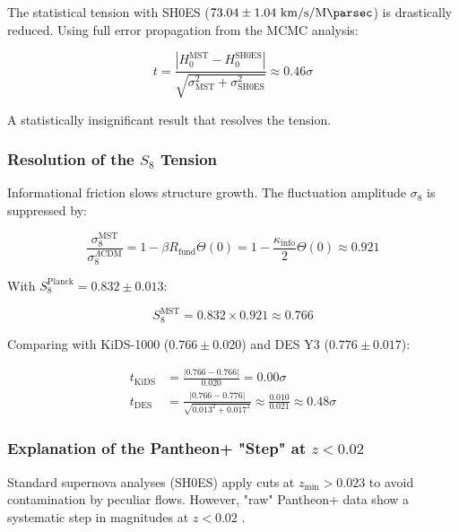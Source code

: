 \documentclass[11pt, a4paper]{article}
\theoremstyle{plain}
\theoremstyle{definition}
\newcommand{\Rfactor}{R_{\text{fund}}}
\newcommand{\Kinfo}{\kappa_{\text{info}}}
\begin{document}
The statistical tension with SH0ES ($73.04 \pm 1.04\ \si{\kilo\meter\per\second\per\mega\parsec}$) is drastically reduced. Using full error propagation from the MCMC analysis:

\begin{equation}
t = \frac{|H_0^{\text{MST}} - H_0^{\text{SH0ES}}|}{\sqrt{\sigma_{\text{MST}}^2 + \sigma_{\text{SH0ES}}^2}} \approx 0.46\sigma
\end{equation}

A statistically insignificant result that resolves the tension.

\subsubsection{Resolution of the \texorpdfstring{$S_8$}{S8} Tension}

Informational friction slows structure growth. The fluctuation amplitude $\sigma_8$ is suppressed by:

\begin{equation}
\frac{\sigma_8^{\text{MST}}}{\sigma_8^{\Lambda\text{CDM}}} = 1 - \beta\Rfactor \Theta(0) = 1 - \frac{\Kinfo}{2} \Theta(0) \approx 0.921
\end{equation}

With $S_8^{\text{Planck}} = 0.832 \pm 0.013$:

\begin{equation}
S_8^{\text{MST}} = 0.832 \times 0.921 \approx 0.766
\end{equation}

Comparing with KiDS-1000 ($0.766 \pm 0.020$) and DES Y3 ($0.776 \pm 0.017$):

\begin{align}
t_{\text{KiDS}} &= \frac{|0.766 - 0.766|}{0.020} = 0.00\sigma \\
t_{\text{DES}} &= \frac{|0.766 - 0.776|}{\sqrt{0.013^2 + 0.017^2}} \approx \frac{0.010}{0.021} \approx 0.48\sigma
\end{align}

\subsubsection{Explanation of the Pantheon+ "Step" at \texorpdfstring{$z < 0.02$}{z < 0.02}}

Standard supernova analyses (SH0ES) apply cuts at $z_{\text{min}} > 0.023$ to avoid contamination by peculiar flows. However, "raw" Pantheon+ data show a systematic step in magnitudes at $z < 0.02$ \cite{Brout2022}.
\end{document}
